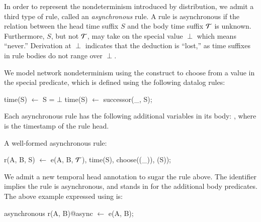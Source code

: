 
In order to represent the nondeterminism introduced by distribution, we admit a
third type of rule, called an {\em asynchronous} rule.  A rule is asynchronous
if the 
relation between the head time suffix $S$ and the body time suffix $\Tau$ is
unknown.  Furthermore, $S$, but not $\Tau$, may take on the special value
$\perp$ which means ``never.''  Derivation at $\perp$ indicates that the
deduction is ``lost,'' as time suffixes in rule bodies do not range over
$\perp$.

We model network nondeterminism using the  construct to choose
from a value in the special 
predicate, which is defined using the following datalog rules:

\begin{Dedalus}
time(S) \(\leftarrow\) S = \(\bot\)
time(S) \(\leftarrow\) successor(_, S);
\end{Dedalus}

Each asynchronous rule has the following additional variables in its
body: , where
 is the timestamp of the rule head.

\begin{example}
A well-formed asynchronous \lang rule:

\begin{Dedalus}
r(A, B, S) \(\leftarrow\) 
  e(A, B, \(\Tau\)),
  time(S), choose((_)), (S));
\end{Dedalus}
\end{example}

We admit a new temporal head annotation to sugar the rule above.  The
identifier  implies the rule is asynchronous, and stands in for the additional body predicates.
The above example expressed using  is:

\begin{Dedalus}
asynchronous
r(A, B)@async \(\leftarrow\) e(A, B);
\end{Dedalus}

